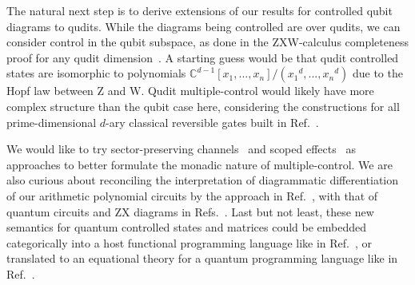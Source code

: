 The natural next step is to derive extensions of our results for controlled qubit diagrams to qudits.
While the diagrams being controlled are over qudits, we can consider control in the qubit subspace, as done in the ZXW-calculus completeness proof for any qudit dimension~\cite{poor2023completeness}.
A starting guess would be that qudit controlled states are isomorphic to polynomials $\mathbb{C}^{d-1}[x_1,...,x_n]/({x_1}^d,...,{x_n}^d)$ due to the Hopf law between Z and W.
Qudit multiple-control would likely have more complex structure than the qubit case here, considering the constructions for all prime-dimensional $d$-ary classical reversible gates built in Ref.~\cite{Roy2023quditzh}.

We would like to try sector-preserving channels~\cite{Vanrietvelde2021ctrlsector} and scoped effects~\cite{lindley2024scoped} as approaches to better formulate the monadic nature of multiple-control.
We are also curious about reconciling the interpretation of diagrammatic differentiation of our arithmetic polynomial circuits by the approach in Ref.~\cite{wilson2023diffpolycirc}, with that of quantum circuits and ZX diagrams in Refs.~\cite{toumi2021diagdiff, wang2022diffintzx, jeandel2024adddiffzx}.
Last but not least, these new semantics for quantum controlled states and matrices could be embedded categorically into a host functional programming language like in Ref.~\cite{rennela2020clctrllinlogic}, or translated to an equational theory for a quantum programming language like in Ref.~\cite{staton2015algqpl}.